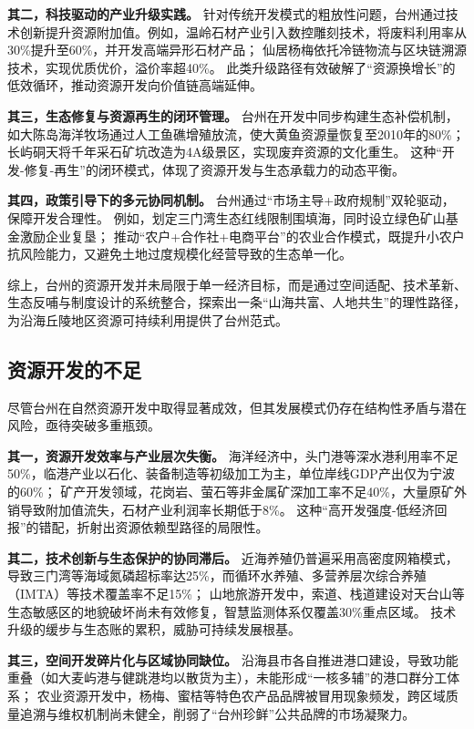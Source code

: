 \documentclass[11pt]{article}
\begin{document}
\textbf{其二，科技驱动的产业升级实践。}
针对传统开发模式的粗放性问题，台州通过技术创新提升资源附加值。例如，温岭石材产业引入数控雕刻技术，将废料利用率从30\%提升至60\%，并开发高端异形石材产品；
仙居杨梅依托冷链物流与区块链溯源技术，实现优质优价，溢价率超40\%。
此类升级路径有效破解了“资源换增长”的低效循环，推动资源开发向价值链高端延伸。

\textbf{其三，生态修复与资源再生的闭环管理。}
台州在开发中同步构建生态补偿机制，如大陈岛海洋牧场通过人工鱼礁增殖放流，使大黄鱼资源量恢复至2010年的80\%；
长屿硐天将千年采石矿坑改造为4A级景区，实现废弃资源的文化重生。
这种“开发-修复-再生”的闭环模式，体现了资源开发与生态承载力的动态平衡。

\textbf{其四，政策引导下的多元协同机制。}
台州通过“市场主导+政府规制”双轮驱动，保障开发合理性。
例如，划定三门湾生态红线限制围填海，同时设立绿色矿山基金激励企业复垦；
推动“农户+合作社+电商平台”的农业合作模式，既提升小农户抗风险能力，又避免土地过度规模化经营导致的生态单一化。

综上，台州的资源开发并未局限于单一经济目标，而是通过空间适配、技术革新、生态反哺与制度设计的系统整合，探索出一条“山海共富、人地共生”的理性路径，为沿海丘陵地区资源可持续利用提供了台州范式。

\subsection{资源开发的不足}\label{subsec:resource-deficiency}

尽管台州在自然资源开发中取得显著成效，但其发展模式仍存在结构性矛盾与潜在风险，亟待突破多重瓶颈。

\textbf{其一，资源开发效率与产业层次失衡。}
海洋经济中，头门港等深水港利用率不足 50\%，临港产业以石化、装备制造等初级加工为主，单位岸线GDP产出仅为宁波的60\%；
矿产开发领域，花岗岩、萤石等非金属矿深加工率不足40\%，大量原矿外销导致附加值流失，石材产业利润率长期低于8\%。
这种“高开发强度-低经济回报”的错配，折射出资源依赖型路径的局限性。

\textbf{其二，技术创新与生态保护的协同滞后。}
近海养殖仍普遍采用高密度网箱模式，导致三门湾等海域氮磷超标率达25\%，而循环水养殖、多营养层次综合养殖（IMTA）等技术覆盖率不足15\%；
山地旅游开发中，索道、栈道建设对天台山等生态敏感区的地貌破坏尚未有效修复，智慧监测体系仅覆盖30\%重点区域。
技术升级的缓步与生态账的累积，威胁可持续发展根基。

\textbf{其三，空间开发碎片化与区域协同缺位。}
沿海县市各自推进港口建设，导致功能重叠（如大麦屿港与健跳港均以散货为主），未能形成“一核多辅”的港口群分工体系；
农业资源开发中，杨梅、蜜桔等特色农产品品牌被冒用现象频发，跨区域质量追溯与维权机制尚未健全，削弱了“台州珍鲜”公共品牌的市场凝聚力。
\end{document}

